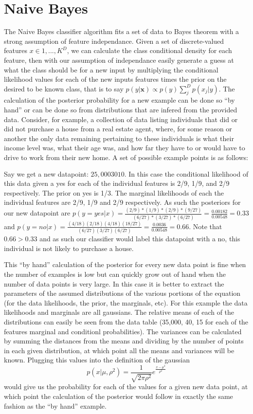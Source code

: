 \section{Naive Bayes}
The Naive Bayes classifier algorithm fits a set of data to Bayes theorem with a strong assumption of
feature independance. Given a set of discrete-valued features $x \in {1,...,K}^D$, we can calculate
the class conditional density for each feature, then with our assumption of independance easily generate
a guess at what the class should be for a new input by multiplying the conditional likelihood values
for each of the new inputs features times the prior on the desired to be known class, that is to say
$p(y|\textbf{x}) \propto p(y) \sum_{j}^{D}p(x_j|y)$. The calculation of the posterior probability for a new
example can be done so ``by hand'' or can be done so from distributions that are infered from the
provided data. Consider, for example, a collection of data listing individuals that did or did not purchase
a house from a real estate agent, where, for some reason or another the only data remaining pertaining to
these individuals is what their income level was, what their age was, and how far they have to or would have
to drive to work from their new home. A set of possible example points is as follows:

Say we get a new datapoint: $25,000 30 10$. In this case the conditional likelihood of this data given a
yes for each of the individual features is 2/9, 1/9, and 2/9 respectively. The prior on yes is 1/3. The
marginal likelihoods of each the individual features are 2/9, 1/9 and 2/9 respectively. As such the
posteriors for our new datapoint are $p(y=yes|x)=\frac{(2/9)*(1/9)*(2/9)*(9/27)}{(6/27)*(3/27)*(6/27)} = \frac{0.00182}{0.00548} = 0.33$ and $p(y=no|x)=\frac{(4/18)(2/18)(4/18)(18/27)}{(6/27)(3/27)(6/27)} = \frac{0.0036}{0.00548} = 0.66$. Note that $0.66 > 0.33$ and as such our classifier would label this datapoint with
a no, this individual is not likely to purchase a house.

This ``by hand'' calculation of the posterior for every new data point is fine when the number of
examples is low but can quickly grow out of hand when the number of data points is very large. In
this case it is better to extract the parameters of the assumed distributions of the various
portions of the equation (for the data likelihoods, the prior, the marginals, etc). For this example
the data likelihoods and marginals are all gaussians. The relative means of each of the distributions can
easily be seen from the data table (35,000, 40, 15 for each of the features marginal and conditionl
probabilities). The variances can be calculated by summing the distances from the means and dividing by
the number of points in each given distribution, at which point all the means and variances will be known.
Plugging this values into the definition of the gaussian $$p(x|\mu,\rho^{2})=\frac{1}{\sqrt{2\pi\rho^{2}}}e^{\frac{x-\mu^{2}}{\rho^{2}}}$$ would give us the probability for each of the values for a given new data point,
at which point the calculation of the posterior would follow in exactly the same fashion as the ``by hand'' example.
